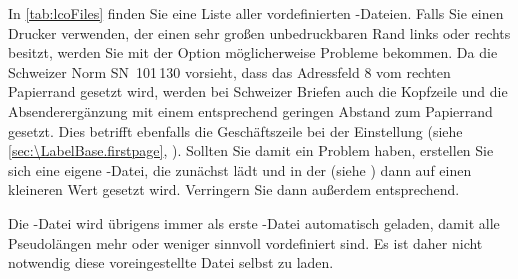 In \autoref{tab:lcoFiles} finden Sie eine Liste aller vordefinierten
-Dateien. Falls Sie einen Drucker verwenden, der
einen sehr großen unbedruckbaren Rand links oder rechts besitzt, werden Sie
mit der Option  möglicherweise Probleme
bekommen. Da die Schweizer Norm SN~101\,130 vorsieht, dass das Adressfeld
8 vom rechten Papierrand gesetzt wird, werden bei Schweizer Briefen
auch die Kopfzeile und die Absenderergänzung mit einem entsprechend geringen
Abstand zum Papierrand gesetzt. Dies betrifft ebenfalls die Geschäftszeile bei
der Einstellung
%
(siehe \autoref{sec:\LabelBase.firstpage},
). Sollten Sie damit
ein Problem haben, erstellen Sie sich eine eigene -Datei, die
zunächst  lädt und in der
 (siehe
) dann auf einen kleineren
Wert gesetzt wird.  Verringern Sie dann außerdem
entsprechend.

Die\label{tipp:\LabelBase.DIN} -Datei
 wird übrigens immer als erste
-Datei automatisch geladen, damit alle Pseudolängen mehr oder
weniger sinnvoll vordefiniert sind. Es ist daher nicht notwendig diese
voreingestellte Datei selbst zu laden.

